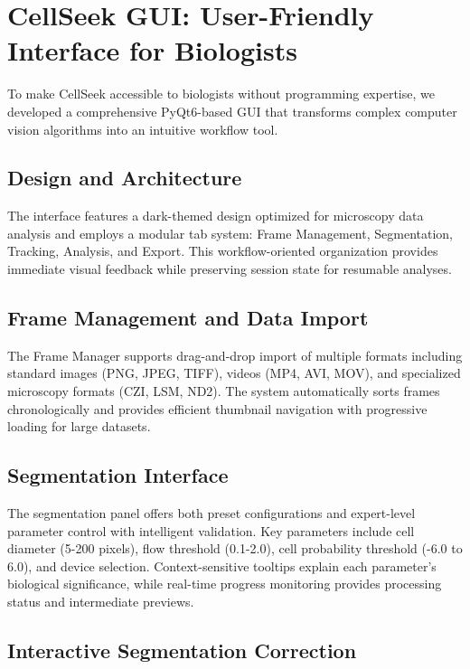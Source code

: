 \documentclass[../cellseek_paper.tex]{subfiles}
\begin{document}
\section{CellSeek GUI: User-Friendly Interface for Biologists}

To make CellSeek accessible to biologists without programming expertise, we developed a comprehensive PyQt6-based GUI that transforms complex computer vision algorithms into an intuitive workflow tool.

\subsection{Design and Architecture}

The interface features a dark-themed design optimized for microscopy data analysis and employs a modular tab system: Frame Management, Segmentation, Tracking, Analysis, and Export. This workflow-oriented organization provides immediate visual feedback while preserving session state for resumable analyses.

\subsection{Frame Management and Data Import}

The Frame Manager supports drag-and-drop import of multiple formats including standard images (PNG, JPEG, TIFF), videos (MP4, AVI, MOV), and specialized microscopy formats (CZI, LSM, ND2). The system automatically sorts frames chronologically and provides efficient thumbnail navigation with progressive loading for large datasets.

\subsection{Segmentation Interface}

The segmentation panel offers both preset configurations and expert-level parameter control with intelligent validation. Key parameters include cell diameter (5-200 pixels), flow threshold (0.1-2.0), cell probability threshold (-6.0 to 6.0), and device selection. Context-sensitive tooltips explain each parameter's biological significance, while real-time progress monitoring provides processing status and intermediate previews.

\subsection{Interactive Segmentation Correction}
\end{document}
